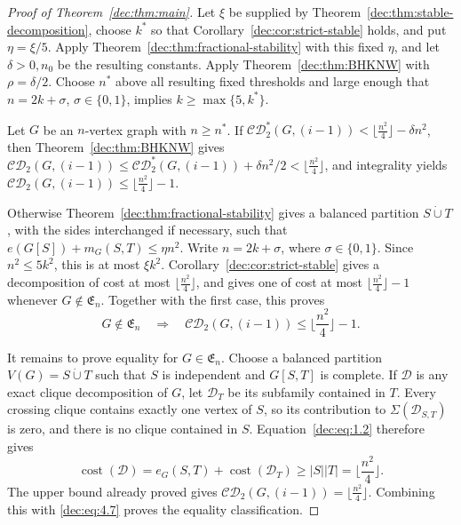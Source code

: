 \documentclass[11pt]{article}
\numberwithin{equation}{section}
\theoremstyle{remark}
\DeclareMathOperator{\cost}{cost}
\newcommand{\dotcupunion}{\mathbin{\dot\cup}}
\newcommand{\CD}{\mathcal{CD}}
\newcommand{\CDstar}{\mathcal{CD}^{*}}
\begin{document}
\begin{proof}[Proof of Theorem~\ref{dec:thm:main}]
Let \(\xi\) be supplied by Theorem~\ref{dec:thm:stable-decomposition}, choose
\(k^\ast\) so that Corollary~\ref{dec:cor:strict-stable} holds, and put \(\eta=\xi/5\).
Apply Theorem~\ref{dec:thm:fractional-stability} with this fixed \(\eta\),
and let \(\delta>0,n_0\) be the resulting constants.
Apply Theorem~\ref{dec:thm:BHKNW} with \(\rho=\delta/2\).
Choose \(n^\ast\) above all resulting fixed thresholds and large enough that
\(n=2k+\sigma\), \(\sigma\in\{0,1\}\), implies \(k\ge\max\{5,k^\ast\}\).

Let \(G\) be an \(n\)-vertex graph with \(n\ge n^\ast\).
If \(\CDstar_2(G,(i-1))<\lfloor \frac{n^2}{4}\rfloor-\delta n^2\), then Theorem~\ref{dec:thm:BHKNW} gives
\(\CD_2(G,(i-1))\le\CDstar_2(G,(i-1))+\delta n^2/2<\lfloor \frac{n^2}{4}\rfloor\),
and integrality yields \(\CD_2(G,(i-1))\le \lfloor \frac{n^2}{4}\rfloor-1\).

Otherwise Theorem~\ref{dec:thm:fractional-stability} gives a balanced
partition \(S\dotcupunion T\), with the sides interchanged if necessary,
such that \(e(G[S])+m_G(S,T)\le\eta n^2\). Write \(n=2k+\sigma\),
where \(\sigma\in\{0,1\}\). Since \(n^2\le5k^2\), this is at most \(\xi k^2\).
Corollary~\ref{dec:cor:strict-stable} gives a decomposition of cost at most
\(\lfloor \frac{n^2}{4}\rfloor\), and gives one of cost at most \(\lfloor \frac{n^2}{4}\rfloor-1\) whenever
\(G\notin\mathfrak E_n\). Together with the first case, this proves
\begin{equation}\label{dec:eq:4.7}
 G\notin\mathfrak E_n
 \quad\Longrightarrow\quad
 \CD_2(G,(i-1))\le \lfloor \frac{n^2}{4}\rfloor-1.
\end{equation}

It remains to prove equality for \(G\in\mathfrak E_n\). Choose a
balanced partition \(V(G)=S\dotcupunion T\) such that \(S\) is independent and \(G[S,T]\) is complete.
If \(\mathcal D\) is any exact clique decomposition of \(G\), let \(\mathcal D_T\) be its subfamily contained in \(T\).
Every crossing clique contains exactly one vertex of \(S\), so its contribution to \(\Sigma(\mathcal D_{S,T})\) is zero,
and there is no clique contained in \(S\). Equation~\eqref{dec:eq:1.2} therefore gives
\begin{equation*}
 \cost(\mathcal D)
 =e_G(S,T)+\cost(\mathcal D_T)
 \ge |S||T|=\lfloor \frac{n^2}{4}\rfloor.
\end{equation*}
The upper bound already proved gives \(\CD_2(G,(i-1))=\lfloor \frac{n^2}{4}\rfloor\).
Combining this with \eqref{dec:eq:4.7} proves the equality classification.
\end{proof}
\end{document}
